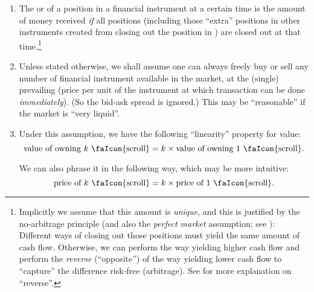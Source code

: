 \begin{enumerate}
\item The  or  of a position in a financial instrument
 at a certain time is the amount of money 
received \emph{if} all positions (including those ``extra'' positions in other
instruments created from closing out the position in ) are
closed out at that time.\footnote{Implicitly we assume that this amount is
\emph{unique}, and this is justified by the no-arbitrage principle (and also
the \emph{perfect market} assumption; see ):
Different ways of closing out those positions must yield the same amount of
cash flow.  Otherwise, we can perform the way yielding higher cash flow and
perform the \emph{reverse} (``opposite'') of the way yielding lower cash flow
to ``capture'' the difference risk-free (arbitrage). See 
for more explanation on ``reverse''.}

\item \label{it:buy-sell-any-num}
Unless stated otherwise, we shall assume one can always freely buy or sell any
number of financial instrument available in the market, at the (single)
prevailing  (price per unit of the instrument at which
transaction can be done \emph{immediately}). (So the bid-ask spread is
ignored.) This may be ``reasonable'' if the market is ``very liquid''.

\item \label{it:value-linear}
Under this assumption, we have the following ``linearity'' property for
value:
\[
\text{value of owning \(k\) \faIcon{scroll}} = k\times\text{value of owning 1 \faIcon{scroll}}.
\]
\begin{note}
We can also phrase it in the following way, which may be more intuitive:
\[
\text{price of \(k\) \faIcon{scroll}} = k\times\text{price of 1 \faIcon{scroll}}.
\]
\end{note}


\end{enumerate}
